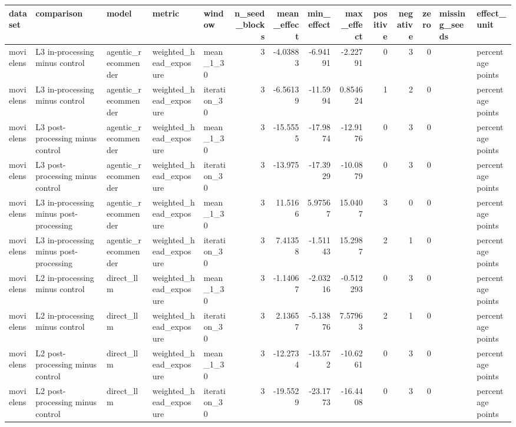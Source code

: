 \begin{table}[htbp!]
\centering
\small
\setlength{\tabcolsep}{3pt}
\renewcommand{\arraystretch}{1.1}
\begin{tabular}{lllllrrrrrrrll}
\hline
dataset & comparison & model & metric & window & n\_seed\_blocks & mean\_effect & min\_effect & max\_effect & positive & negative & zero & missing\_seeds & effect\_unit \\
\hline
movielens & L3 in-processing minus control & agentic\_recommender & weighted\_head\_exposure & mean\_1\_30 & 3 & -4.03883 & -6.94191 & -2.22791 & 0 & 3 & 0 &  & percentage points \\
movielens & L3 in-processing minus control & agentic\_recommender & weighted\_head\_exposure & iteration\_30 & 3 & -6.56139 & -11.5994 & 0.854624 & 1 & 2 & 0 &  & percentage points \\
movielens & L3 post-processing minus control & agentic\_recommender & weighted\_head\_exposure & mean\_1\_30 & 3 & -15.5555 & -17.9874 & -12.9176 & 0 & 3 & 0 &  & percentage points \\
movielens & L3 post-processing minus control & agentic\_recommender & weighted\_head\_exposure & iteration\_30 & 3 & -13.975 & -17.3929 & -10.0879 & 0 & 3 & 0 &  & percentage points \\
movielens & L3 in-processing minus post-processing & agentic\_recommender & weighted\_head\_exposure & mean\_1\_30 & 3 & 11.5166 & 5.97567 & 15.0407 & 3 & 0 & 0 &  & percentage points \\
movielens & L3 in-processing minus post-processing & agentic\_recommender & weighted\_head\_exposure & iteration\_30 & 3 & 7.41358 & -1.51143 & 15.2987 & 2 & 1 & 0 &  & percentage points \\
movielens & L2 in-processing minus control & direct\_llm & weighted\_head\_exposure & mean\_1\_30 & 3 & -1.14067 & -2.03216 & -0.512293 & 0 & 3 & 0 &  & percentage points \\
movielens & L2 in-processing minus control & direct\_llm & weighted\_head\_exposure & iteration\_30 & 3 & 2.13657 & -5.13876 & 7.57963 & 2 & 1 & 0 &  & percentage points \\
movielens & L2 post-processing minus control & direct\_llm & weighted\_head\_exposure & mean\_1\_30 & 3 & -12.2734 & -13.572 & -10.6261 & 0 & 3 & 0 &  & percentage points \\
movielens & L2 post-processing minus control & direct\_llm & weighted\_head\_exposure & iteration\_30 & 3 & -19.5529 & -23.1773 & -16.4408 & 0 & 3 & 0 &  & percentage points \\

\end{tabular}
\end{table}
